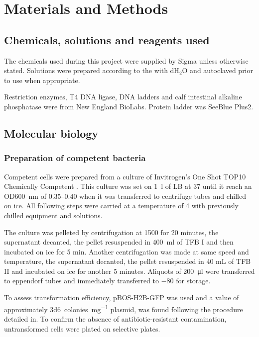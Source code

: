 \chapter{Materials and Methods}
\label{ch:methods}

\section{Chemicals, solutions and reagents used}
  The chemicals used during this project were supplied by Sigma unless otherwise
  stated. Solutions were prepared according to the  with
  dH$_2$O and autoclaved prior to use when appropriate.
  
  Restriction enzymes, T4 DNA ligase, DNA ladders and calf intestinal alkaline phosphatase
  were from New England BioLabs. Protein ladder was SeeBlue Plus2.


\section{Molecular biology}
  \subsection{Preparation of competent bacteria}
    Competent  cells were prepared from a culture of Invitrogen's One Shot
    TOP10 Chemically Competent . This culture was set on \SI{1}{\l} of LB at
    \SI{37}{\dc} until it reach an OD\SI{600}{\nm} of \numrange{0.35}{0.40} when it was
    transferred to centrifuge tubes and chilled on ice. All following steps were carried at a temperature of
    \SI{4}{\dc} with previously chilled equipment and solutions.
    
    The culture was pelleted by centrifugation at \SI{1500}{\gn} for 20 minutes, the supernatant
    decanted, the pellet resuspended in \SI{400}{\ml} of TFB I and then incubated on ice for
    5 min. Another centrifugation was made at same speed and temperature, the supernatant decanted,
    the pellet resuspended in 40 mL of TFB II and incubated on ice for another 5 minutes. Aliquots of
    \SI{200}{\ul} were transferred to eppendorf tubes and immediately transferred to \SI{-80}{\dc}
    for storage.
    
    To assess transformation efficiency, pBOS-H2B-GFP was used and a value of approximately
    \SI{3d6}{colonies\per\mg} plasmid, was found following the procedure detailed in.
    To confirm the absence of antibiotic-resistant contamination, untransformed cells were plated
    on selective plates.

